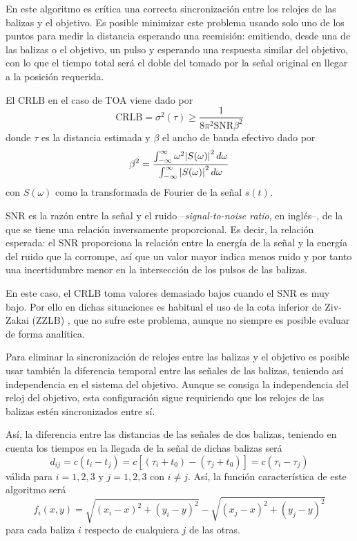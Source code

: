 En este algoritmo es crítica una correcta sincronización entre los relojes de las balizas y el objetivo.
Es posible minimizar este problema usando solo uno de los puntos para medir la distancia esperando una reemisión: emitiendo, desde una de las balizas o el objetivo, un pulso y esperando una respuesta similar del objetivo, con lo que el tiempo total será el doble del tomado por la señal original en llegar a la posición requerida.

El CRLB en el caso de TOA viene dado por \cite{Xbook}
\begin{equation}\label{eq:CRLB_TOA}
    \text{CRLB} = \sigma^2(\tau) \geq \frac{1}{8\pi^2\text{SNR}\beta^2}
\end{equation}
donde $\tau$ es la distancia estimada y $\beta$ el ancho de banda efectivo dado por
\begin{equation}
    \beta^2 = \frac{\int_{-\infty}^{\infty} \omega^2 \abs{S(\omega)}^2\dd{\omega}}{\int_{-\infty}^{\infty} \abs{S(\omega)}^2\dd{\omega}}
\end{equation}
con $S(\omega)$ como la transformada de Fourier de la señal $s(t)$.

SNR es la razón entre la señal y el ruido --\textit{signal-to-noise ratio}, en inglés--, de la que se tiene una relación inversamente proporcional.
Es decir, la relación esperada: el SNR proporciona la relación entre la energía de la señal y la energía del ruido que la corrompe, así que un valor mayor indica menos ruido y por tanto una incertidumbre menor en la intersección de los pulsos de las balizas.

En este caso, el CRLB toma valores demasiado bajos cuando el SNR es muy bajo.
Por ello en dichas situaciones es habitual el uso de la cota inferior de Ziv-Zakai (ZZLB) \cite{soganzi}, que no sufre este problema, aunque no siempre es posible evaluar de forma analítica.


Para eliminar la sincronización de relojes entre las balizas y el objetivo es posible usar también la diferencia temporal entre las señales de las balizas, teniendo así independencia en el sistema del objetivo.
Aunque se consiga la independencia del reloj del objetivo, esta configuración sigue requiriendo que los relojes de las balizas estén sincronizados entre sí.

Así, la diferencia entre las distancias de las señales de dos balizas, teniendo en cuenta los tiempos en la llegada de la señal de dichas balizas será
\begin{equation}\label{eq:TDOA}
        d_{ij} = c(t_i - t_j) = c \left[  (\tau_i + t_0) - (\tau_j + t_0)\right] = c(\tau_i - \tau_j)
\end{equation}
válida para $i=1,2,3$ y $j=1,2,3$ con $i \neq j$.
Así, la función característica de este algoritmo será
\begin{equation}\label{eq:funcion_TDOA}
    f_i(x,y) = \sqrt{(x_i - x)^2 + (y_i - y)^2} - \sqrt{(x_j - x)^2 + (y_j - y)^2}
\end{equation}
para cada baliza $i$ respecto de cualquiera $j$ de las otras.

